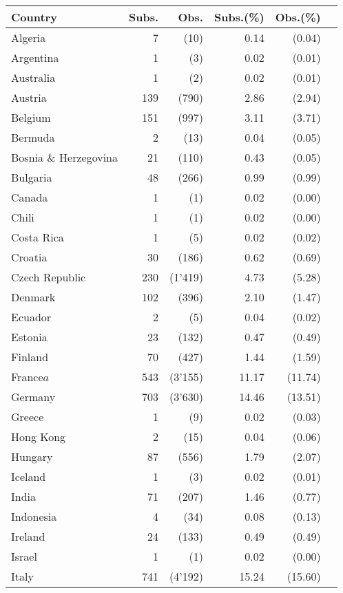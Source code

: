 \documentclass[10pt,twocolumn,oneside,cmyk]{article}
\begin{document}
\begin{table}
\begin{center}
 \label{tab4}
 \footnotesize
  \begin{tabularx}{\linewidth}{p{}r r r r r}
   \toprule
   Country &Subs. &Obs. &Subs.(\%) &Obs.(\%)\\
   \midrule
   Algeria &7 &(10) &0.14 &(0.04)\\
   Argentina &1 &(3) &0.02 &(0.01)\\
   Australia &1 &(2) &0.02 &(0.01)\\
   Austria &139 &(790) &2.86 &(2.94)\\
   Belgium &151 &(997) &3.11 &(3.71)\\
   Bermuda &2 &(13) &0.04 &(0.05)\\
   \scriptsize{Bosnia \& Herzegovina} &21 &(110) &0.43 &(0.05)\\
   Bulgaria &48 &(266) &0.99 &(0.99)\\
   Canada &1 &(1) &0.02 &(0.00)\\
   Chili &1 &(1) &0.02 &(0.00)\\
   Costa Rica &1 &(5) &0.02 &(0.02)\\
   Croatia &30 &(186) &0.62 &(0.69)\\
   Czech Republic &230 &(1'419) &4.73 &(5.28)\\
   Denmark &102 &(396) &2.10 &(1.47)\\
   Ecuador &2 &(5) &0.04 &(0.02)\\
   Estonia &23 &(132) &0.47 &(0.49)\\
   Finland &70 &(427) &1.44 &(1.59)\\
   France$a$ &543 &(3'155) &11.17 &(11.74)\\
   Germany &703 &(3'630) &14.46 &(13.51)\\
   Greece &1 &(9) &0.02 &(0.03)\\
   Hong Kong &2 &(15) &0.04 &(0.06)\\
   Hungary &87 &(556) &1.79 &(2.07)\\
   Iceland &1 &(3) &0.02 &(0.01)\\
   India &71 &(207) &1.46 &(0.77)\\
   Indonesia &4 &(34) &0.08 &(0.13)\\
   Ireland &24 &(133) &0.49 &(0.49)\\
   Israel &1 &(1) &0.02 &(0.00)\\
   Italy &741 &(4'192) &15.24 &(15.60)\\

\end{tabularx}
\end{center}
\end{table}
\end{document}
